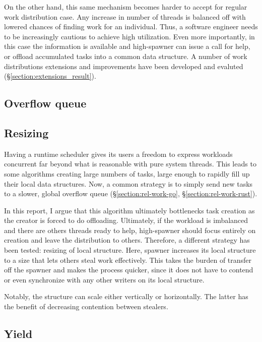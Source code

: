 \documentclass[12pt,a4paper,twoside]{report}
\begin{document}
On the other hand, this same mechanism becomes harder to accept for regular work distribution case. Any increase in number of threads is balanced off with lowered chances of finding work for an individual. Thus, a software engineer needs to be increasingly cautious to achieve high utilization. Even more importantly, in this case the information is available and high-spawner can issue a call for help, or offload accumulated tasks into a common data structure. A number of work distributions extensions and improvements have been developed and evaluted (\S\ref{section:extensions_result}).

\subsection{Overflow queue}
\label{section:design_overflow_queue}

\subsection{Resizing}
\label{section:resizing}
Having a runtime scheduler gives its users a freedom to express workloads concurrent far beyond what is reasonable with pure system threads. This leads to some algorithms creating large numbers of tasks, large enough to rapidly fill up their local data structures. Now, a common strategy is to simply send new tasks to a slower, global overflow queue (\S\ref{section:rel-work-go}, \S\ref{section:rel-work-rust}).

In this report, I argue that this algorithm ultimately bottlenecks task creation as the creator is forced to do offloading. Ultimately, if the workload is imbalanced and there are others threads ready to help, high-spawner should focus entirely on creation and leave the distribution to others. Therefore, a different strategy has been tested: resizing of local structure. Here, spawner increases its local structure to a size that lets others steal work effectively. This takes the burden of transfer off the spawner and makes the process quicker, since it does not have to contend or even synchronize with any other writers on its local structure. 

Notably, the structure can scale either vertically or horizontally. The latter has the benefit of decreasing contention between stealers.  

\subsection{Yield}
\label{section:yield}
\end{document}
